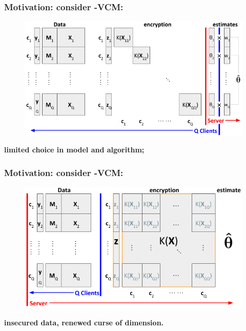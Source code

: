 \documentclass{beamer}
\begin{document}
\begin{frame}\frametitle{Motivation: \textbf{consider
      -VCM:}} %
  \begin{figure}\includegraphics[width=.90\textwidth]{img/meta0}\end{figure}
  \textbf{}  \textbf{limited choice in model and
    algorithm;}
\end{frame}
\begin{frame}\frametitle{Motivation: \textbf{consider
      -VCM:}} %
  \begin{figure}\includegraphics[width=.90\textwidth]{img/mega0}\end{figure}
  \textbf{ insecured data, renewed curse of
    dimension.}
\end{frame}
\end{document}
